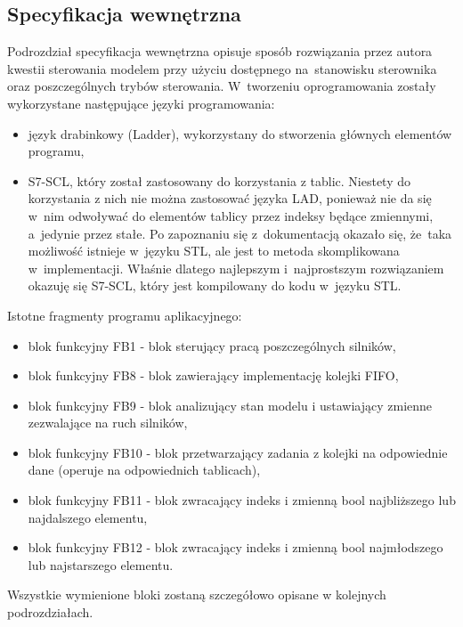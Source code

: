 \subsection{Specyfikacja wewnętrzna}
Podrozdział specyfikacja wewnętrzna opisuje sposób rozwiązania przez autora kwestii sterowania modelem przy użyciu dostępnego na~stanowisku sterownika oraz poszczególnych trybów sterowania.
W~tworzeniu oprogramowania zostały wykorzystane następujące języki programowania:
\begin{itemize} 
\item język drabinkowy (Ladder), wykorzystany do stworzenia głównych elementów programu,
\item S7-SCL, który został zastosowany do korzystania z tablic. Niestety do korzystania z nich nie można zastosować języka LAD, ponieważ nie da się w~nim odwoływać do elementów tablicy przez indeksy będące zmiennymi, a~jedynie przez stałe. Po zapoznaniu się z~dokumentacją okazało się, że~taka możliwość istnieje w~języku STL, ale jest to metoda skomplikowana w~implementacji. Właśnie dlatego najlepszym i~najprostszym rozwiązaniem okazuję się S7-SCL, który jest kompilowany do kodu w~języku STL.
\end{itemize} 
Istotne fragmenty programu aplikacyjnego:
\begin{itemize} 
\item blok funkcyjny FB1 - blok sterujący pracą poszczególnych silników,
\item blok funkcyjny FB8 - blok zawierający implementację kolejki FIFO,
\item blok funkcyjny FB9 - blok analizujący stan modelu i ustawiający zmienne zezwalające na ruch silników,
\item blok funkcyjny FB10 - blok przetwarzający zadania z kolejki na odpowiednie dane (operuje na odpowiednich tablicach),
\item blok funkcyjny FB11 - blok zwracający indeks i zmienną bool najbliższego lub najdalszego elementu,
\item blok funkcyjny FB12 - blok zwracający indeks i zmienną bool najmłodszego lub najstarszego elementu.
\end{itemize} 
\indent
\indent Wszystkie wymienione bloki zostaną szczegółowo opisane w kolejnych podrozdziałach.
\vspace*{-9mm}
